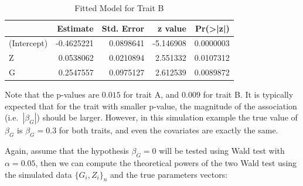 \documentclass[
]{article}
\newenvironment{Shaded}{\begin{snugshade}}{\end{snugshade}}
\newcommand{\AttributeTok}[1]{\textcolor[rgb]{0.77,0.63,0.00}{#1}}
\newcommand{\DecValTok}[1]{\textcolor[rgb]{0.00,0.00,0.81}{#1}}
\newcommand{\DocumentationTok}[1]{\textcolor[rgb]{0.56,0.35,0.01}{\textbf{\textit{#1}}}}
\newcommand{\FunctionTok}[1]{\textcolor[rgb]{0.00,0.00,0.00}{#1}}
\newcommand{\NormalTok}[1]{#1}
\newcommand{\OtherTok}[1]{\textcolor[rgb]{0.56,0.35,0.01}{#1}}
\newcommand{\SpecialCharTok}[1]{\textcolor[rgb]{0.00,0.00,0.00}{#1}}
\newcommand{\StringTok}[1]{\textcolor[rgb]{0.31,0.60,0.02}{#1}}
\begin{document}
\begin{Shaded}
\end{Shaded}

\begin{table}[H]

\caption{\label{tab:unnamed-chunk-1}Fitted Model for Trait B}
\centering
\fontsize{10}{12}\selectfont
\begin{tabular}[t]{l|r|r|r|r}
\hline
  & Estimate & Std. Error & z value & Pr(>|z|)\\
\hline
(Intercept) & -0.4625221 & 0.0898641 & -5.146908 & 0.0000003\\
\hline
Z & 0.0538062 & 0.0210894 & 2.551332 & 0.0107312\\
\hline
G & 0.2547557 & 0.0975127 & 2.612539 & 0.0089872\\
\hline
\end{tabular}
\end{table}

Note that the p-values are \(0.015\) for trait A, and \(0.009\) for
trait B. It is typically expected that for the trait with smaller
p-value, the magnitude of the association (i.e.~\(|\beta_G|\)) should be
larger. However, in this simulation example the true value of
\(\beta_G\) is \(\beta_G=0.3\) for both traits, and even the covariates
are exactly the same.

Again, assume that the hypothesis \(\beta_G = 0\) will be tested using
Wald test with \(\alpha=0.05\), then we can compute the theoretical
powers of the two Wald test using the simulated data \(\{G_i,Z_i\}_n\)
and the true parameters vectors:
\end{document}
